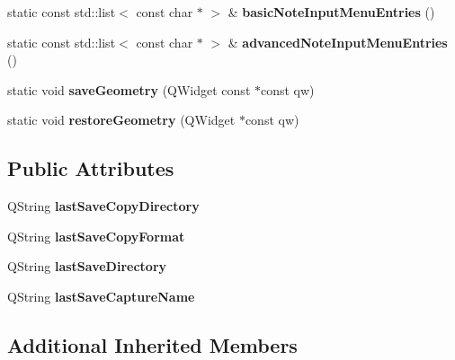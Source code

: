 \begin{DoxyCompactItemize}
\item 
\mbox{\label{class_ms_1_1_muse_score_a86ee98da4dd6332bb5a7ab8583ec22fb}} 
static const std\+::list$<$ const char $\ast$ $>$ \& {\bfseries basic\+Note\+Input\+Menu\+Entries} ()
\item 
\mbox{\label{class_ms_1_1_muse_score_a21c40cea7f1dd70609810cd378fabeab}} 
static const std\+::list$<$ const char $\ast$ $>$ \& {\bfseries advanced\+Note\+Input\+Menu\+Entries} ()
\item 
\mbox{\label{class_ms_1_1_muse_score_a0956f96ac562692cac5808868369d9a4}} 
static void {\bfseries save\+Geometry} (Q\+Widget const $\ast$const qw)
\item 
\mbox{\label{class_ms_1_1_muse_score_ab2a49e5380820ea001d8517e377ea44b}} 
static void {\bfseries restore\+Geometry} (Q\+Widget $\ast$const qw)
\end{DoxyCompactItemize}
\subsection*{Public Attributes}
\begin{DoxyCompactItemize}
\item 
\mbox{\label{class_ms_1_1_muse_score_ab87b27dad64af47a0de3c820180d43ba}} 
Q\+String {\bfseries last\+Save\+Copy\+Directory}
\item 
\mbox{\label{class_ms_1_1_muse_score_ab86369220bec32d05bfd2e3efe23b855}} 
Q\+String {\bfseries last\+Save\+Copy\+Format}
\item 
\mbox{\label{class_ms_1_1_muse_score_ad0e5e4bdbea7ff716156e3f2d9927e46}} 
Q\+String {\bfseries last\+Save\+Directory}
\item 
\mbox{\label{class_ms_1_1_muse_score_ab373439d2177ba458d3e390a87b5c963}} 
Q\+String {\bfseries last\+Save\+Capture\+Name}
\end{DoxyCompactItemize}
\subsection*{Additional Inherited Members}


